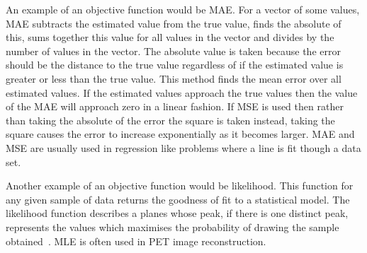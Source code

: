             An example of an objective function would be \gls{MAE}. For a vector of some values, \gls{MAE} subtracts the estimated value from the true value, finds the absolute of this, sums together this value for all values in the vector and divides by the number of values in the vector. The absolute value is taken because the error should be the distance to the true value regardless of if the estimated value is greater or less than the true value. This method finds the mean error over all estimated values. If the estimated values approach the true values then the value of the \gls{MAE} will approach zero in a linear fashion. If \gls{MSE} is used then rather than taking the absolute of the error the square is taken instead, taking the square causes the error to increase exponentially as it becomes larger. \gls{MAE} and \gls{MSE} are usually used in regression like problems where a line is fit though a data set.
            
            Another example of an objective function would be likelihood. This function for any given sample of data returns the goodness of fit to a statistical model. The likelihood function describes a planes whose peak, if there is one distinct peak, represents the values which maximises the probability of drawing the sample obtained~. \gls{MLE} is often used in \gls{PET} image reconstruction.
            
